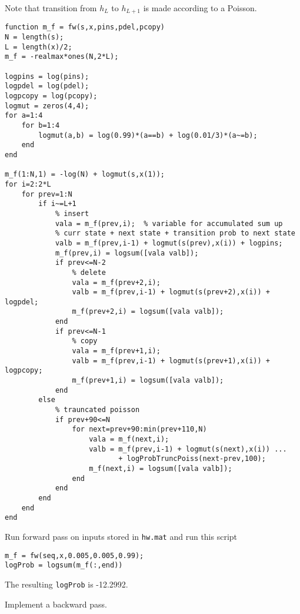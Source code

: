 \documentclass{article}
\begin{document}
Note that transition from $h_{L}$ to $h_{L+1}$ is made according to a Poisson.
\begin{verbatim}
function m_f = fw(s,x,pins,pdel,pcopy)
N = length(s);
L = length(x)/2;
m_f = -realmax*ones(N,2*L);

logpins = log(pins);
logpdel = log(pdel);
logpcopy = log(pcopy);
logmut = zeros(4,4);
for a=1:4
    for b=1:4
        logmut(a,b) = log(0.99)*(a==b) + log(0.01/3)*(a~=b);
    end
end

m_f(1:N,1) = -log(N) + logmut(s,x(1));
for i=2:2*L
    for prev=1:N
        if i~=L+1
            % insert
            vala = m_f(prev,i);  % variable for accumulated sum up             
            % curr state + next state + transition prob to next state            
            valb = m_f(prev,i-1) + logmut(s(prev),x(i)) + logpins;
            m_f(prev,i) = logsum([vala valb]);
            if prev<=N-2
                % delete
                vala = m_f(prev+2,i);
                valb = m_f(prev,i-1) + logmut(s(prev+2),x(i)) + logpdel;
                m_f(prev+2,i) = logsum([vala valb]);
            end
            if prev<=N-1
                % copy
                vala = m_f(prev+1,i);
                valb = m_f(prev,i-1) + logmut(s(prev+1),x(i)) + logpcopy;
                m_f(prev+1,i) = logsum([vala valb]);
            end
        else
            % trauncated poisson
            if prev+90<=N
                for next=prev+90:min(prev+110,N)
                    vala = m_f(next,i);
                    valb = m_f(prev,i-1) + logmut(s(next),x(i)) ...
                           + logProbTruncPoiss(next-prev,100);
                    m_f(next,i) = logsum([vala valb]);
                end
            end
        end
    end
end
\end{verbatim}
Run forward pass on inputs stored in {\tt hw\theHW.mat} and run this script
\begin{verbatim}
m_f = fw(seq,x,0.005,0.005,0.99);
logProb = logsum(m_f(:,end))
\end{verbatim}
The resulting {\tt logProb} is -12.2992.

\newproblem{3pt} Implement a backward pass.
\end{document}
